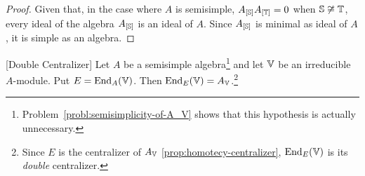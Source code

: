 \begin{proof}
    Given that, in the case where $A$ is semisimple, $A_{[\mathbb S]}A_{[\mathbb T]}=0$ when $\mathbb S\not\cong\mathbb T$, every ideal of the algebra $A_{[\mathbb S]}$ is an ideal of $A$. Since $A_{[\mathbb S]}$ is minimal as ideal of $A$, it is simple as an algebra. 
\end{proof}

\begin{thm}\label{thm:double-centrilzer} {\rm[Double Centralizer]}
    Let\/ $A$ be a semisimple algebra\footnote{Problem~\ref{probl:semisimplicity-of-A_V} shows that this hypothesis is actually unnecessary.} and let\/ $\mathbb V$ be an irreducible\/ $A$-module. Put\/ $E = {\operatorname{End}}_A(\mathbb V)$. Then\/ ${\operatorname{End}}_E(\mathbb V) = A_\mathbb V$.\footnote{Since $E$ is the centralizer of $A_\mathbb V$ \eqref{prop:homotecy-centralizer}, ${\operatorname{End}}_E(\mathbb V)$ is its \textit{double} centralizer.}
\end{thm}

